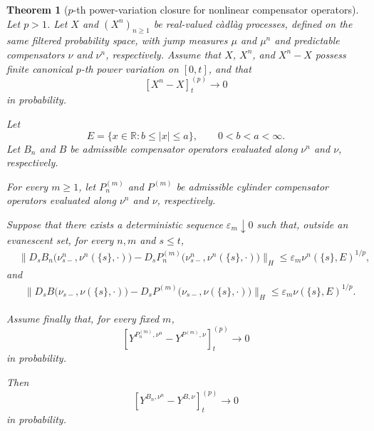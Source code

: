 \documentclass[a4paper,10pt]{article}
\newtheorem{thm}{Theorem}[section]
\begin{document}
\begin{thm}[\(p\)-th power-variation closure for nonlinear compensator operators]
\label{thm:nonlinear-total-p-variation-closure}
Let \(p>1\). Let \(X\) and \((X^n)_{n\ge1}\) be real-valued
càdlàg processes, defined on the same filtered probability space, with
jump measures \(\mu\) and \(\mu^n\) and predictable compensators
\(\nu\) and \(\nu^n\), respectively. Assume that \(X\), \(X^n\), and
\(X^n-X\) possess finite canonical \(p\)-th power variation on
\([0,t]\), and that
\[
        [X^n-X]^{(p)}_t
        \longrightarrow0
\]
in probability.

Let
\[
        E=\{x\in\mathbb R:b\le |x|\le a\},
        \qquad 0<b<a<\infty.
\]
Let \(B_n\) and \(B\) be admissible compensator operators evaluated
along \(\nu^n\) and \(\nu\), respectively.

For every \(m\ge1\), let \(P_n^{(m)}\) and \(P^{(m)}\) be admissible
cylinder compensator operators evaluated along \(\nu^n\) and \(\nu\),
respectively.

Suppose that there exists a deterministic sequence
\(\varepsilon_m\downarrow0\) such that, outside an evanescent set, for
every \(n,m\) and \(s\le t\),
\[
\begin{aligned}
&\lVert
D_sB_n
\bigl(
        \nu^n_{s-},
        \nu^n(\{s\},\cdot)
\bigr)
-
D_sP_n^{(m)}
\bigl(
        \nu^n_{s-},
        \nu^n(\{s\},\cdot)
\bigr)
\rVert_H
\le
\varepsilon_m
\nu^n(\{s\},E)^{1/p},
\end{aligned}
\]
and
\[
\begin{aligned}
&\lVert
D_sB
\bigl(
        \nu_{s-},
        \nu(\{s\},\cdot)
\bigr)
-
D_sP^{(m)}
\bigl(
        \nu_{s-},
        \nu(\{s\},\cdot)
\bigr)
\rVert_H
\le
\varepsilon_m
\nu(\{s\},E)^{1/p}.
\end{aligned}
\]

Assume finally that, for every fixed \(m\),
\[
\left[
Y^{P_n^{(m)},\nu^n}
-
Y^{P^{(m)},\nu}
\right]^{(p)}_t
\longrightarrow0
\]
in probability.

Then
\[
        [Y^{B_n,\nu^n}-Y^{B,\nu}]^{(p)}_t
        \longrightarrow0
\]
in probability.
\end{thm}
\end{document}
